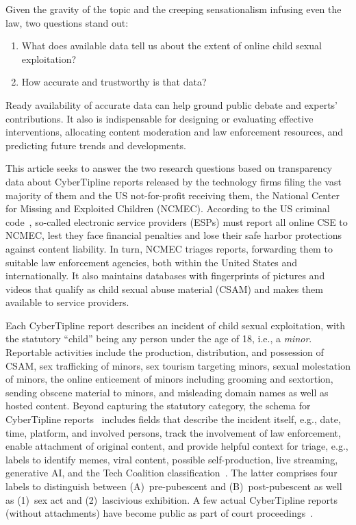 \documentclass[anonymous,nonacm,screen,12pt]{acmart}
\newcommand\V[1]{{#1}}
\newcommand\V[1]{\textsc{\MakeLowercase{#1}}}
\theoremstyle{definition}
\begin{document}
Given the gravity of the topic and the creeping sensationalism infusing even the
law, two questions stand out:
\begin{enumerate}
\item What does available data tell us about the extent of online child sexual
exploitation?
\item How accurate and trustworthy is that data?
\end{enumerate}
Ready availability of accurate data can help ground public debate and experts'
contributions. It also is indispensable for designing or evaluating effective
interventions, allocating content moderation and law enforcement resources, and
predicting future trends and developments.

This article seeks to answer the two research questions based on transparency
data about CyberTipline reports released by the technology firms filing the vast
majority of them and the \V{US} not-for-profit receiving them, the National
Center for Missing and Exploited Children (\V{NCMEC}). According to the \V{US}
criminal code~\cite{USCode18Chapter110, USCode18Section1591}, so-called
electronic service providers (\V{ESP}s) must report all online \V{CSE} to
\V{NCMEC}, lest they face financial penalties and lose their safe harbor
protections against content liability. In turn, \V{NCMEC} triages reports,
forwarding them to suitable law enforcement agencies, both within the United
States and internationally. It also maintains databases with fingerprints of
pictures and videos that qualify as child sexual abuse material (\V{CSAM}) and
makes them available to service providers.

Each CyberTipline report describes an incident of child sexual exploitation,
with the statutory ``child'' being any person under the age of 18, i.e., a
\emph{minor}. Reportable activities include the production, distribution, and
possession of \V{CSAM}, sex trafficking of minors, sex tourism targeting minors,
sexual molestation of minors, the online enticement of minors including grooming
and sextortion, sending obscene material to minors, and misleading domain names
as well as hosted content. Beyond capturing the statutory category, the schema
for CyberTipline reports~\cite{NCMEC2024} includes fields that describe the
incident itself, e.g., date, time, platform, and involved persons, track the
involvement of law enforcement, enable attachment of original content, and
provide helpful context for triage, e.g., labels to identify memes, viral
content, possible self-production, live streaming, generative \V{AI}, and the
Tech Coalition classification~\cite{TechCoalition2022a}. The latter comprises
four labels to distinguish between (A)~pre-pubescent and (B)~post-pubescent as
well as (1)~sex act and (2)~lascivious exhibition. A few actual CyberTipline
reports (without attachments) have become public as part of court
proceedings~\cite{CyberTipline5074778, CyberTipline5778397}.
\end{document}
